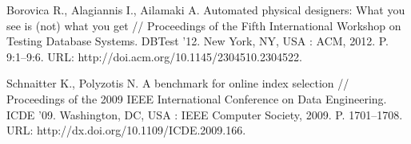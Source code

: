 \documentclass[unicode]{beamer}
\begin{document}
\begin{frame}[allowframebreaks]
{\begin{thebibliography}{99}
 Borovica R., Alagiannis I., Ailamaki A. Automated physical designers: What you see is (not) what you get // Proceedings of the Fifth International Workshop on Testing Database Systems. DBTest ’12. New York, NY, USA : ACM, 2012. P. 9:1–9:6. URL: http://doi.acm.org/10.1145/2304510.2304522.

 Schnaitter K., Polyzotis N. A benchmark for online index selection // Proceedings of the 2009 IEEE International Conference on Data Engineering. ICDE ’09. Washington, DC, USA : IEEE Computer Society, 2009. P. 1701--1708. URL: http://dx.doi.org/10.1109/ICDE.2009.166.


\end{thebibliography}
}
\end{frame}

\end{document}
